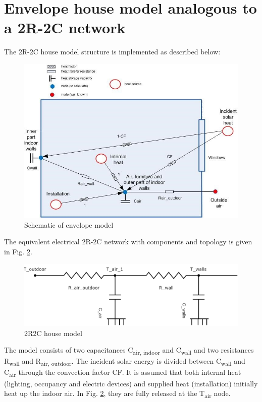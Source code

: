 \section{Envelope house model analogous to a 2R-2C network}

The 2R-2C house model structure is implemented as described below:
	
\begin{figure}[H]
	\centering
	\includegraphics[width=1.0\columnwidth]{Pictures/envelopRC.jpg}
	\caption[Short title]{Schematic of envelope model}
	\label{fig:schematic2R2C}
	\end{figure} 
	
The equivalent electrical 2R-2C network with components and topology is given in Fig. \ref{fig:eq2R2C}.

\begin{figure}[H]
	\centering
	\includegraphics[width=1.0\columnwidth]{Pictures/2R2C_Model.png}
	\caption[Short title]{2R2C house model}
	\label{fig:eq2R2C}
	\end{figure}
	
The model consists of two capacitances C\textsubscript{air, indoor} and C\textsubscript{wall} and two resistances R\textsubscript{wall} and R\textsubscript{air, outdoor}. The incident solar energy is divided between C\textsubscript{wall} and C\textsubscript{air} through the convection factor CF. It is assumed that both internal heat (lighting, occupancy and electric devices) and supplied heat (installation) initially heat up the indoor air. In Fig. \ref{fig:eq2R2C}, they are fully released at the T\textsubscript{air} node. 


